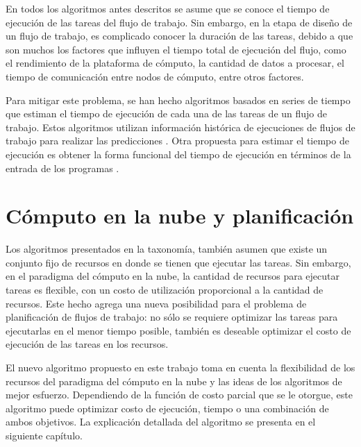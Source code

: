 En todos los algoritmos antes descritos se asume que se conoce el tiempo de ejecución de las tareas del flujo de trabajo. Sin embargo, en la etapa de diseño de un flujo de trabajo, es complicado conocer la duración de las tareas, debido a que son muchos los factores que influyen el tiempo total de ejecución del flujo, como el rendimiento de la plataforma de cómputo, la cantidad de datos a procesar, el tiempo de comunicación entre nodos de cómputo, entre otros factores. 

Para mitigar este problema, se han hecho algoritmos basados en series de tiempo que estiman el tiempo de ejecución de cada una de las tareas de un flujo de trabajo. Estos algoritmos utilizan información histórica de ejecuciones de flujos de trabajo para realizar las predicciones  \cite{liu2011novel}. Otra propuesta para estimar el tiempo de ejecuci\'on es obtener la forma funcional del tiempo de ejecuci\'on en t\'erminos de la entrada de los programas \cite{coppa2012input}.

\section{Cómputo en la nube y planificación}

Los algoritmos presentados en la taxonomía, también asumen que existe un conjunto fijo de recursos en donde se tienen que ejecutar las tareas. Sin embargo, en el paradigma del cómputo en la nube, la cantidad de recursos para ejecutar tareas es flexible, con un costo de utilización proporcional a la cantidad de recursos. Este hecho agrega una nueva posibilidad para el problema de planificación de flujos de trabajo: no sólo se requiere optimizar las tareas para ejecutarlas en el menor tiempo posible, también es deseable optimizar el costo de ejecución de las tareas en los recursos.

El nuevo algoritmo propuesto en este trabajo toma en cuenta la flexibilidad de los recursos del paradigma del cómputo en la nube y las ideas de los algoritmos de mejor esfuerzo. Dependiendo de la función de costo parcial que se le otorgue, este algoritmo puede optimizar costo de ejecución, tiempo o una combinación de ambos objetivos. La explicación detallada del algoritmo se presenta en el siguiente capítulo.
